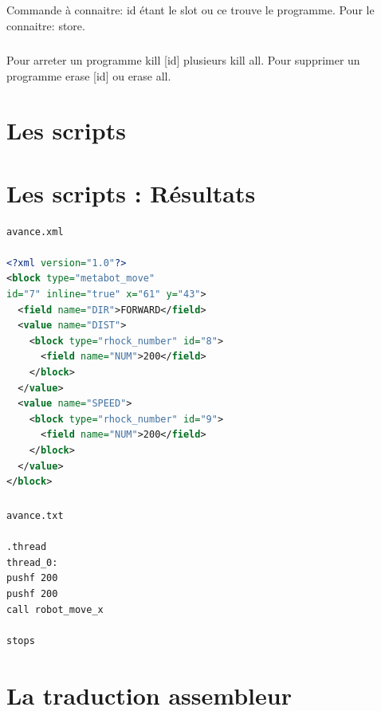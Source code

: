 \documentclass[10pt,a4paper]{report}
\begin{document}
\begin{appendices}
\paragraph{}
Commande à connaitre:
id étant le slot ou ce trouve le programme. Pour le connaitre: store.
\paragraph{}
Pour arreter un programme kill [id] plusieurs kill all. Pour supprimer un programme erase [id] ou erase all.

\chapter{Les scripts} 





\chapter{Les scripts : Résultats} 
\begin{lstlisting}[language=xml, frame=none]
avance.xml

<?xml version="1.0"?>
<block type="metabot_move" 
id="7" inline="true" x="61" y="43">
  <field name="DIR">FORWARD</field>
  <value name="DIST">
    <block type="rhock_number" id="8">
      <field name="NUM">200</field>
    </block>
  </value>
  <value name="SPEED">
    <block type="rhock_number" id="9">
      <field name="NUM">200</field>
    </block>
  </value>
</block>
\end{lstlisting}
\paragraph{}

\begin{verbatim}
avance.txt

.thread
thread_0:
pushf 200
pushf 200
call robot_move_x

stops 
\end{verbatim}
\chapter{La traduction assembleur} 



\end{appendices}
\end{document}
